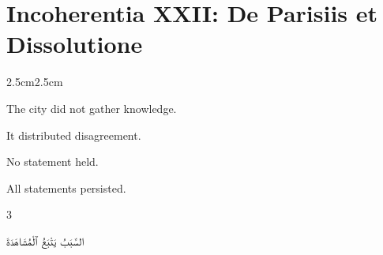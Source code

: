 
\chapter*{Incoherentia XXII: De Parisiis et Dissolutione}

\pagestyle{incoherence}

\vspace{2em}

\begin{adjustwidth}{2.5cm}{2.5cm}

The city did not gather knowledge.

\medskip

It distributed disagreement.

\vspace{2em}

No statement held.

\medskip

All statements persisted.

\vspace{3em}

\end{adjustwidth}

\begin{paracol}{3}

\switchcolumn


\medskip


\medskip


\vspace{3em}

\switchcolumn

\begin{AR}
السَّبَبُ يَتْبَعُ ٱلْمُشَاهَدَةَ
\end{AR}

\medskip


\vspace{3em}

\switchcolumn*


\medskip


\vspace{3em}

\end{paracol}

